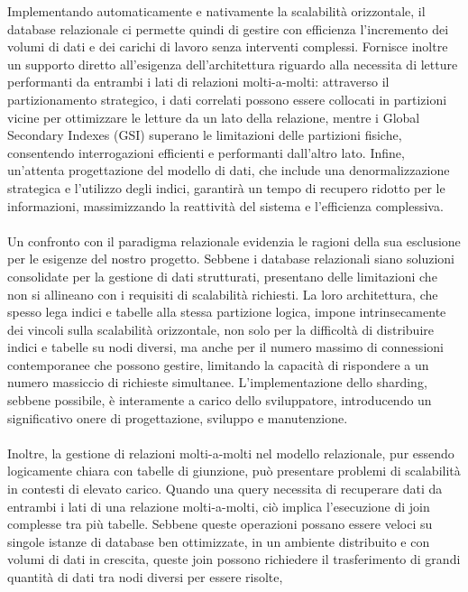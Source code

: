 Implementando automaticamente e nativamente la scalabilità orizzontale,
il database relazionale ci permette quindi di gestire con efficienza
l'incremento dei volumi di dati e dei carichi di lavoro senza interventi complessi.
Fornisce inoltre un supporto diretto all'esigenza dell'architettura
riguardo alla necessita di letture performanti
da entrambi i lati di relazioni molti-a-molti:
attraverso il partizionamento strategico,
i dati correlati possono essere collocati in partizioni vicine
per ottimizzare le letture da un lato della relazione,
mentre i Global Secondary Indexes (GSI) superano le limitazioni delle partizioni fisiche,
consentendo interrogazioni efficienti e performanti dall'altro lato.
Infine, un'attenta progettazione del modello di dati,
che include una denormalizzazione strategica e l'utilizzo degli indici,
garantirà un tempo di recupero ridotto per le informazioni,
massimizzando la reattività del sistema e l'efficienza complessiva.\\
\\
Un confronto con il paradigma relazionale evidenzia le ragioni della sua esclusione per le esigenze del nostro progetto.
Sebbene i database relazionali siano soluzioni consolidate per la gestione di dati strutturati,
presentano delle limitazioni che non si allineano con i requisiti di scalabilità richiesti.
La loro architettura, che spesso lega indici e tabelle alla stessa partizione logica,
impone intrinsecamente dei vincoli sulla scalabilità orizzontale,
non solo per la difficoltà di distribuire indici e tabelle su nodi diversi,
ma anche per il numero massimo di connessioni contemporanee che possono gestire,
limitando la capacità di rispondere a un numero massiccio di richieste simultanee.
L'implementazione dello sharding, sebbene possibile, è interamente a carico dello sviluppatore,
introducendo un significativo onere di progettazione, sviluppo e manutenzione.\\
\\
Inoltre, la gestione di relazioni molti-a-molti nel modello relazionale,
pur essendo logicamente chiara con tabelle di giunzione,
può presentare problemi di scalabilità in contesti di elevato carico.
Quando una query necessita di recuperare dati da entrambi i lati di una relazione molti-a-molti,
ciò implica l'esecuzione di join complesse tra più tabelle.
Sebbene queste operazioni possano essere veloci su singole istanze di database ben ottimizzate,
in un ambiente distribuito e con volumi di dati in crescita,
queste join possono richiedere il trasferimento di grandi quantità di dati tra nodi diversi per essere risolte,
